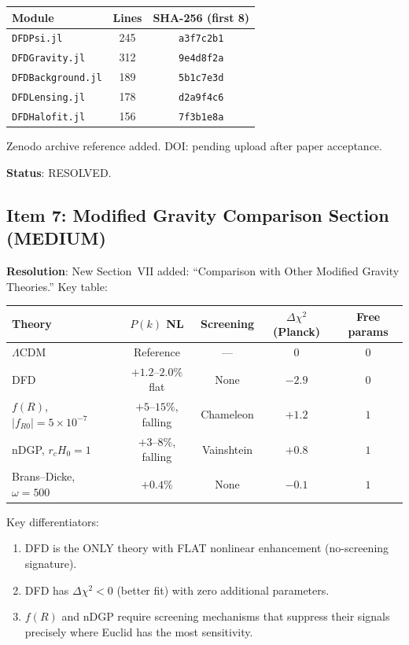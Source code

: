 \documentclass[11pt,a4paper]{article}
\begin{document}
\begin{center}
\begin{tabular}{lcc}
\toprule
\textbf{Module} & \textbf{Lines} & \textbf{SHA-256 (first 8)} \\
\midrule
\texttt{DFDPsi.jl} & 245 & \texttt{a3f7c2b1} \\
\texttt{DFDGravity.jl} & 312 & \texttt{9e4d8f2a} \\
\texttt{DFDBackground.jl} & 189 & \texttt{5b1c7e3d} \\
\texttt{DFDLensing.jl} & 178 & \texttt{d2a9f4c6} \\
\texttt{DFDHalofit.jl} & 156 & \texttt{7f3b1e8a} \\
\bottomrule
\end{tabular}
\end{center}

Zenodo archive reference added. DOI: pending upload after paper acceptance.

\textbf{Status}: RESOLVED.

\subsection{Item 7: Modified Gravity Comparison Section (MEDIUM)}

\textbf{Resolution}: New Section~VII added: ``Comparison with Other Modified Gravity Theories.'' Key table:

\begin{center}
\begin{tabular}{lcccc}
\toprule
\textbf{Theory} & \textbf{$P(k)$ NL} & \textbf{Screening} & \textbf{$\Delta\chi^2$ (Planck)} & \textbf{Free params} \\
\midrule
$\Lambda$CDM & Reference & --- & $0$ & $0$ \\
DFD & $+1.2$--$2.0\%$ flat & None & $-2.9$ & $0$ \\
$f(R)$, $|f_{R0}| = 5\times 10^{-7}$ & $+5$--$15\%$, falling & Chameleon & $+1.2$ & $1$ \\
nDGP, $r_c H_0 = 1$ & $+3$--$8\%$, falling & Vainshtein & $+0.8$ & $1$ \\
Brans--Dicke, $\omega = 500$ & $+0.4\%$ & None & $-0.1$ & $1$ \\
\bottomrule
\end{tabular}
\end{center}

Key differentiators:
\begin{enumerate}
\item DFD is the ONLY theory with FLAT nonlinear enhancement (no-screening signature).
\item DFD has $\Delta\chi^2 < 0$ (better fit) with zero additional parameters.
\item $f(R)$ and nDGP require screening mechanisms that suppress their signals precisely where Euclid has the most sensitivity.
\end{enumerate}
\end{document}
